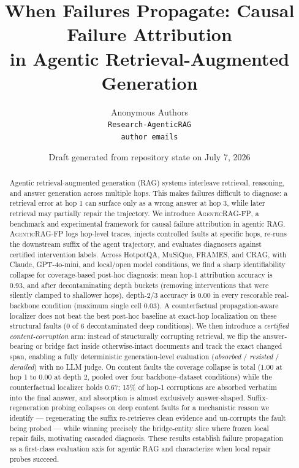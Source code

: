 \documentclass[11pt]{article}
\title{When Failures Propagate: Causal Failure Attribution\\
in Agentic Retrieval-Augmented Generation}
\author{
  Anonymous Authors \\
  \texttt{Research-AgenticRAG} \\
  \texttt{author emails}
}
\date{Draft generated from repository state on July 7, 2026}
\newcommand{\ours}{\textnormal{\textsc{AgenticRAG-FP}}}
\begin{document}
\maketitle

\begin{abstract}
Agentic retrieval-augmented generation (RAG) systems interleave retrieval,
reasoning, and answer generation across multiple hops.  This makes failures
difficult to diagnose: a retrieval error at hop 1 can surface only as a wrong
answer at hop 3, while later retrieval may partially repair the trajectory.  We
introduce \ours, a benchmark and experimental framework for causal failure
attribution in agentic RAG.  \ours{} logs hop-level traces, injects controlled
faults at specific hops, re-runs the downstream suffix of the agent trajectory,
and evaluates diagnosers against certified intervention labels.  Across
HotpotQA, MuSiQue, FRAMES, and CRAG, with Claude, GPT-4o-mini, and local/open
model conditions, we find a sharp identifiability collapse for coverage-based
post-hoc diagnosis: mean hop-1 attribution accuracy is 0.93, and after
decontaminating depth buckets (removing interventions that were silently
clamped to shallower hops), depth-2/3 accuracy is 0.00 in every rescorable
real-backbone condition (maximum single cell 0.03).  A counterfactual
propagation-aware localizer does not beat the best post-hoc baseline at
exact-hop localization on these structural faults (0 of 6 decontaminated deep
conditions).  We then introduce a
\emph{certified content-corruption} arm: instead of structurally corrupting
retrieval, we flip the answer-bearing or bridge fact inside otherwise-intact
documents and track the exact changed span, enabling a fully deterministic
generation-level evaluation (\emph{absorbed} / \emph{resisted} /
\emph{derailed}) with no LLM judge.  On content faults the coverage collapse
is total (1.00 at hop 1 to 0.00 at depth 2, pooled over four
backbone--dataset conditions) while the counterfactual localizer holds 0.67;
15\% of hop-1 corruptions are absorbed verbatim into the final answer, and
absorption is almost exclusively answer-shaped.  Suffix-regeneration probing
collapses on deep content faults for a mechanistic reason we identify ---
regenerating the suffix re-retrieves clean evidence and un-corrupts the fault
being probed --- while winning precisely the bridge-entity slice where frozen
local repair fails, motivating cascaded diagnosis.  These results establish
failure propagation as a first-class evaluation axis for agentic RAG and
characterize when local repair probes succeed.
\end{abstract}
\end{document}
